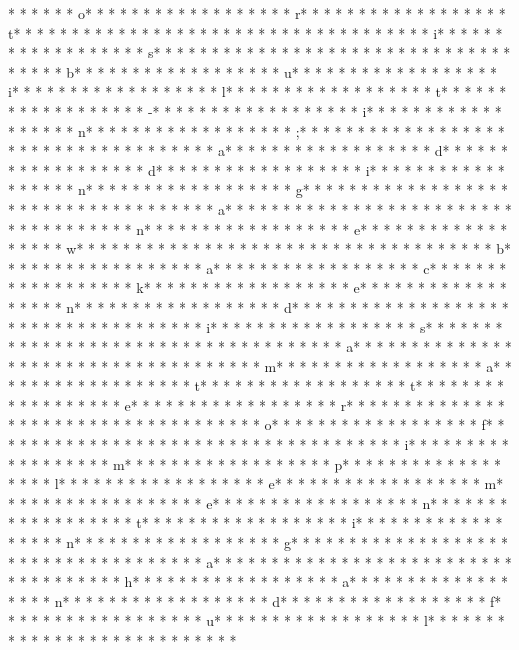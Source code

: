*  *  * * *  * o* * *  * * *  * * *  *  * * *  *  * * *  * r* * *  * * *  * * *  *  * * *  *  * * *  * t* * *  * * *  * * *  *  * * *  *  * * *  *  * * *  * * *  * * *  *  * * *  *  * * *  * i* * *  * * *  * * *  *  * * *  *  * * *  * s* * *  * * *  * * *  *  * * *  *  * * *  *  * * *  * * *  * * *  *  * * *  *  * * *  * b* * *  * * *  * * *  *  * * *  *  * * *  * u* * *  * * *  * * *  *  * * *  *  * * *  * i* * *  * * *  * * *  *  * * *  *  * * *  * l* * *  * * *  * * *  *  * * *  *  * * *  * t* * *  * * *  * * *  *  * * *  *  * * *  * -* * *  * * *  * * *  *  * * *  *  * * *  * i* * *  * * *  * * *  *  * * *  *  * * *  * n* * *  * * *  * * *  *  * * *  *  * * *  * ;* * *  * * *  * * *  *  * * *  *  * * *  *  * * *  * * *  * * *  *  * * *  *  * * *  * a* * *  * * *  * * *  *  * * *  *  * * *  * d* * *  * * *  * * *  *  * * *  *  * * *  * d* * *  * * *  * * *  *  * * *  *  * * *  * i* * *  * * *  * * *  *  * * *  *  * * *  * n* * *  * * *  * * *  *  * * *  *  * * *  * g* * *  * * *  * * *  *  * * *  *  * * *  *  * * *  * * *  * * *  *  * * *  *  * * *  * a* * *  * * *  * * *  *  * * *  *  * * *  *  * * *  * * *  * * *  *  * * *  *  * * *  * n* * *  * * *  * * *  *  * * *  *  * * *  * e* * *  * * *  * * *  *  * * *  *  * * *  * w* * *  * * *  * * *  *  * * *  *  * * *  *  * * *  * * *  * * *  *  * * *  *  * * *  * b* * *  * * *  * * *  *  * * *  *  * * *  * a* * *  * * *  * * *  *  * * *  *  * * *  * c* * *  * * *  * * *  *  * * *  *  * * *  * k* * *  * * *  * * *  *  * * *  *  * * *  * e* * *  * * *  * * *  *  * * *  *  * * *  * n* * *  * * *  * * *  *  * * *  *  * * *  * d* * *  * * *  * * *  *  * * *  *  * * *  *  * * *  * * *  * * *  *  * * *  *  * * *  * i* * *  * * *  * * *  *  * * *  *  * * *  * s* * *  * * *  * * *  *  * * *  *  * * *  *  * * *  * * *  * * *  *  * * *  *  * * *  * a* * *  * * *  * * *  *  * * *  *  * * *  *  * * *  * * *  * * *  *  * * *  *  * * *  * m* * *  * * *  * * *  *  * * *  *  * * *  * a* * *  * * *  * * *  *  * * *  *  * * *  * t* * *  * * *  * * *  *  * * *  *  * * *  * t* * *  * * *  * * *  *  * * *  *  * * *  * e* * *  * * *  * * *  *  * * *  *  * * *  * r* * *  * * *  * * *  *  * * *  *  * * *  *  * * *  * * *  * * *  *  * * *  *  * * *  * o* * *  * * *  * * *  *  * * *  *  * * *  * f* * *  * * *  * * *  *  * * *  *  * * *  *  * * *  * * *  * * *  *  * * *  *  * * *  * i* * *  * * *  * * *  *  * * *  *  * * *  * m* * *  * * *  * * *  *  * * *  *  * * *  * p* * *  * * *  * * *  *  * * *  *  * * *  * l* * *  * * *  * * *  *  * * *  *  * * *  * e* * *  * * *  * * *  *  * * *  *  * * *  * m* * *  * * *  * * *  *  * * *  *  * * *  * e* * *  * * *  * * *  *  * * *  *  * * *  * n* * *  * * *  * * *  *  * * *  *  * * *  * t* * *  * * *  * * *  *  * * *  *  * * *  * i* * *  * * *  * * *  *  * * *  *  * * *  * n* * *  * * *  * * *  *  * * *  *  * * *  * g* * *  * * *  * * *  *  * * *  *  * * *  *  * * *  * * *  * * *  *  * * *  *  * * *  * a* * *  * * *  * * *  *  * * *  *  * * *  *  * * *  * * *  * * *  *  * * *  *  * * *  * h* * *  * * *  * * *  *  * * *  *  * * *  * a* * *  * * *  * * *  *  * * *  *  * * *  * n* * *  * * *  * * *  *  * * *  *  * * *  * d* * *  * * *  * * *  *  * * *  *  * * *  * f* * *  * * *  * * *  *  * * *  *  * * *  * u* * *  * * *  * * *  *  * * *  *  * * *  * l* * *  * * *  * * *  *  * * *  *  * * *  *  * * *  * * *  * * * 